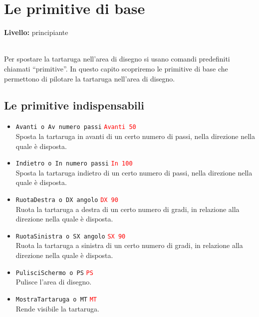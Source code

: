 \chapter{Le primitive di base}

{ }\hfill\textbf{Livello:} principiante\\ \\
\noindent

Per spostare la tartaruga nell'area di disegno si usano comandi predefiniti chiamati ``primitive''. In questo capito scopriremo le primitive di base che permettono di pilotare la tartaruga nell'area di disegno.


\section{Le primitive indispensabili}
\begin{itemize}
	\item \texttt{Avanti o Av numero passi}\hspace {4cm } \textcolor{red}{ \texttt{Avanti 50}}\\
	Sposta la tartaruga in avanti di un certo numero di passi, nella direzione nella quale è disposta.
	
	\item \texttt{Indietro o In numero passi}\hspace {4cm } \textcolor{red}{ \texttt{In 100}}\\
	Sposta la tartaruga indietro di un certo numero di passi, nella direzione nella quale è disposta.

	\item \texttt{RuotaDestra o DX angolo}\hspace {4cm } \textcolor{red}{\texttt{DX 90}}\\
	Ruota la tartaruga a destra di un certo numero di gradi, in relazione alla direzione nella quale è disposta.

	\item \texttt{RuotaSinistra o SX angolo}\hspace {4cm } \textcolor{red}{\texttt{SX 90}}\\
	Ruota la tartaruga a sinistra di un certo numero di gradi, in relazione alla direzione nella quale è disposta.

	\item \texttt{PulisciSchermo o PS}\hspace {4cm } \textcolor{red}{ \texttt{PS}}\\
	Pulisce l'area di disegno.

	\item \texttt{MostraTartaruga o MT}\hspace {4cm } \textcolor{red}{ \texttt{MT}}\\
	Rende visibile la tartaruga.


\end{itemize}
